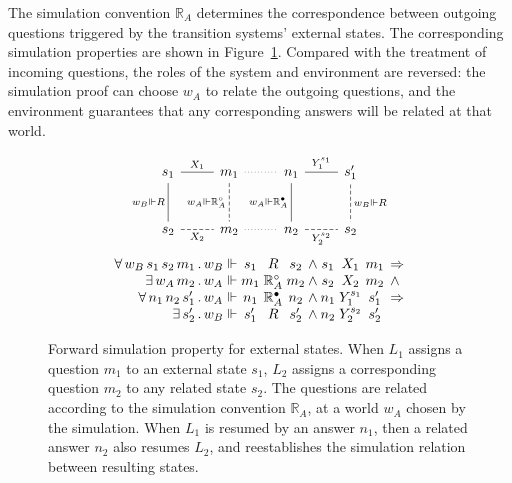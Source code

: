 \documentclass[11pt,oneside,draft]{book}
\theoremstyle{definition}
\newcommand{\que}{\circ}         %
\newcommand{\ans}{\bullet}       %
\begin{document}
The simulation convention $\mathbb{R}_A$
determines the correspondence between
outgoing questions triggered by
the transition systems' external states.
The corresponding simulation properties
are shown in Figure~\ref{fig:fsim-ext}.
Compared with the treatment of incoming questions,
the roles of the system and environment are reversed:
the simulation proof can choose $w_A$
to relate the outgoing questions,
and the environment guarantees that any corresponding answers
will be related at that world.

\begin{figure} %
  \[
    \begin{array}{c}
      \begin{tikzcd}[row sep=large,baseline=-3pt]
        s_1 \ar[r, "X_1", dash] \ar[d, "w_B \Vdash R"', dash] &
        m_1 \ar[r, dotted, dash] \ar[d, "w_A \Vdash \mathbb{R}_A^\que"', dash, dashed] &
        n_1 \ar[r, "Y_1^{s_1}", dash] \ar[d, "w_A \Vdash \mathbb{R}_A^\ans"', dash] &
        s_1' \ar[d, "w_B \Vdash R", dash, dashed]
        \\
        s_2 \ar[r, "X_2"', dash, dashed] &
        m_2 \ar[r, dotted, dash] &
        n_2 \ar[r, "Y_2^{s_2}"', dash, dashed] &
        s_2
      \end{tikzcd}
      \vspace{1.5ex}
      \\
      \begin{array}{
          r @{\,.\,} l @{{} \Vdash {}} c@{}c@{}c @{\:\wedge\:}
                                    c@{}c@{}c @{\:\:} l}
        \forall \, w_B \, s_1 \, s_2 \, m_1 & w_B & s_1 & {}\mathrel{R}{} & s_2 &
                        s_1 & {}\mathrel{X_1}{} & m_1 & \Rightarrow \\
        \exists \, w_A \, m_2 & w_A & m_1 & {}\mathrel{\mathbb{R}_A^\que}{} & m_2 &
                        s_2 & {}\mathrel{X_2}{} & m_2 & \wedge \\
        \forall \, n_1 \, n_2 \, s_1' & w_A & n_1 & {}\mathrel{\mathbb{R}_A^\ans}{} & n_2 &
                        n_1 & {}\mathrel{Y_1^{s_1}}{} & s_1' & \Rightarrow \\
        \exists \, s_2' & w_B & s_1' & {}\mathrel{R}{} & s_2' &
                        n_2 & {}\mathrel{Y_2^{s_2}}{} & s_2' &
      \end{array}
    \end{array}
  \]
  \caption[Forward simulation properties (cont.)]%
   {Forward simulation property for external states.
    When $L_1$ assigns a question $m_1$ to an external state $s_1$,
    $L_2$ assigns a corresponding question $m_2$ to any related state $s_2$.
    The questions are related according to
    the simulation convention $\mathbb{R}_A$,
    at a world $w_A$ chosen by the simulation.
    When $L_1$ is resumed by an answer $n_1$,
    then a related answer $n_2$ also resumes $L_2$,
    and reestablishes the simulation relation
    between resulting states.}
  \label{fig:fsim-ext}
\end{figure}
\end{document}
